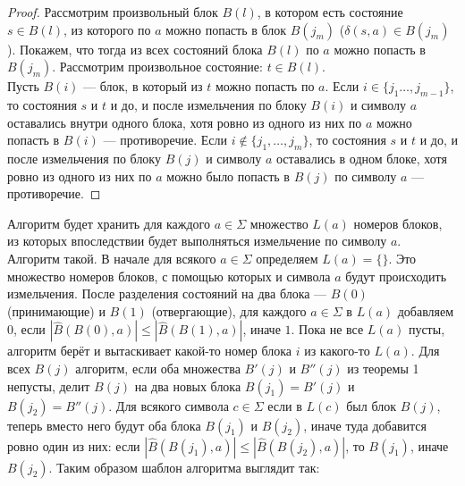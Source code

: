 \documentclass{article}
\begin{document}
\begin{proof}
    Рассмотрим произвольный блок $B(l)$, в котором есть состояние $s \in B(l)$, из которого по $a$ можно попасть в блок $B(j_m)$ ($\delta(s, a) \in B(j_m)$). Покажем, что тогда из всех состояний блока $B(l)$ по $a$ можно попасть в $B(j_m)$. Рассмотрим произвольное состояние: $t \in B(l)$.\\
    Пусть $B(i)$ --- блок, в который из $t$ можно попасть по $a$. Если $i \in \{j_1 \dots, j_{m-1}\}$, то состояния $s$ и $t$ и до, и после измельчения по блоку $B(i)$ и символу $a$ оставались внутри одного блока, хотя ровно из одного из них по $a$ можно попасть в $B(i)$ --- противоречие. Если $i \notin \{j_1, \dots, j_m\}$, то состояния $s$ и $t$ и до, и после измельчения по блоку $B(j)$ и символу $a$ оставались в одном блоке, хотя ровно из одного из них по $a$ можно было попасть в $B(j)$ по символу $a$ --- противоречие.
\end{proof}
Алгоритм будет хранить для каждого $a \in \Sigma$ множество $L(a)$ номеров блоков, из которых впоследствии будет выполняться измельчение по символу $a$.\\
Алгоритм такой. В начале для всякого $a \in \Sigma$ определяем $L(a) = \{\}$. Это множество номеров блоков, с помощью которых и символа $a$ будут происходить измельчения. После разделения состояний на два блока --- $B(0)$ (принимающие) и $B(1)$ (отвергающие), для каждого $a \in \Sigma$ в $L(a)$ добавляем $0$, если $|\hat B(B(0), a)| \le |\hat B(B(1), a)|$, иначе $1$. Пока не все $L(a)$ пусты, алгоритм берёт и вытаскивает какой-то номер блока $i$ из какого-то $L(a)$. Для всех $B(j)$ алгоритм, если оба множества $B'(j)$ и $B''(j)$ из теоремы 1 непусты, делит $B(j)$ на два новых блока $B(j_1) = B'(j)$ и $B(j_2) = B''(j)$. Для всякого символа $c \in \Sigma$ если в $L(c)$ был блок $B(j)$, теперь вместо него будут оба блока $B(j_1)$ и $B(j_2)$, иначе туда добавится ровно один из них: если $|\hat B(B(j_1), a)| \le |\hat B(B(j_2), a)|$, то $B(j_1)$, иначе $B(j_2)$. Таким образом шаблон алгоритма выглядит так:
\end{document}
